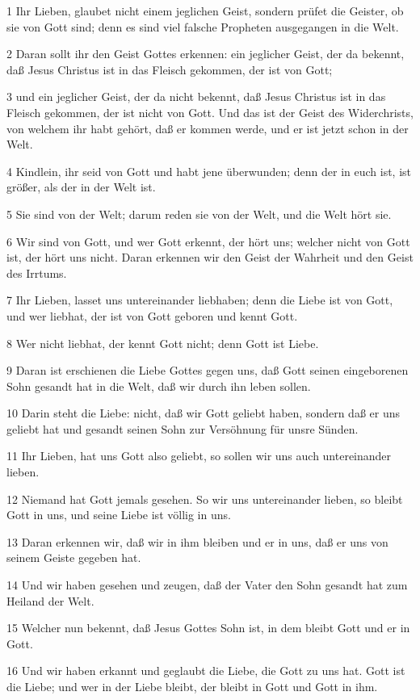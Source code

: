 \par 1 Ihr Lieben, glaubet nicht einem jeglichen Geist, sondern prüfet die Geister, ob sie von Gott sind; denn es sind viel falsche Propheten ausgegangen in die Welt.
\par 2 Daran sollt ihr den Geist Gottes erkennen: ein jeglicher Geist, der da bekennt, daß Jesus Christus ist in das Fleisch gekommen, der ist von Gott;
\par 3 und ein jeglicher Geist, der da nicht bekennt, daß Jesus Christus ist in das Fleisch gekommen, der ist nicht von Gott. Und das ist der Geist des Widerchrists, von welchem ihr habt gehört, daß er kommen werde, und er ist jetzt schon in der Welt.
\par 4 Kindlein, ihr seid von Gott und habt jene überwunden; denn der in euch ist, ist größer, als der in der Welt ist.
\par 5 Sie sind von der Welt; darum reden sie von der Welt, und die Welt hört sie.
\par 6 Wir sind von Gott, und wer Gott erkennt, der hört uns; welcher nicht von Gott ist, der hört uns nicht. Daran erkennen wir den Geist der Wahrheit und den Geist des Irrtums.
\par 7 Ihr Lieben, lasset uns untereinander liebhaben; denn die Liebe ist von Gott, und wer liebhat, der ist von Gott geboren und kennt Gott.
\par 8 Wer nicht liebhat, der kennt Gott nicht; denn Gott ist Liebe.
\par 9 Daran ist erschienen die Liebe Gottes gegen uns, daß Gott seinen eingeborenen Sohn gesandt hat in die Welt, daß wir durch ihn leben sollen.
\par 10 Darin steht die Liebe: nicht, daß wir Gott geliebt haben, sondern daß er uns geliebt hat und gesandt seinen Sohn zur Versöhnung für unsre Sünden.
\par 11 Ihr Lieben, hat uns Gott also geliebt, so sollen wir uns auch untereinander lieben.
\par 12 Niemand hat Gott jemals gesehen. So wir uns untereinander lieben, so bleibt Gott in uns, und seine Liebe ist völlig in uns.
\par 13 Daran erkennen wir, daß wir in ihm bleiben und er in uns, daß er uns von seinem Geiste gegeben hat.
\par 14 Und wir haben gesehen und zeugen, daß der Vater den Sohn gesandt hat zum Heiland der Welt.
\par 15 Welcher nun bekennt, daß Jesus Gottes Sohn ist, in dem bleibt Gott und er in Gott.
\par 16 Und wir haben erkannt und geglaubt die Liebe, die Gott zu uns hat. Gott ist die Liebe; und wer in der Liebe bleibt, der bleibt in Gott und Gott in ihm.
